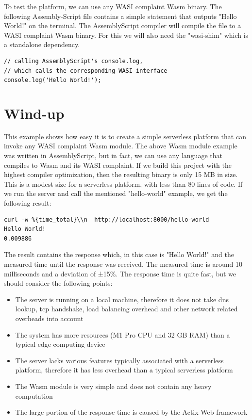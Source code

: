 %
To test the platform, we can use any WASI complaint Wasm binary. The following Assembly-Script file contains a simple statement that outputs "Hello World!" on the terminal. The AssemblyScript compiler will compile the file to a WASI complaint Wasm binary. For this we will also need the "wasi-shim" which is a standalone dependency.
%
\begin{lstlisting}[frame=lines, style=JavaScript, caption={AssemblyScript file with a simple console output}, showstringspaces=false, label={lst:as-hello-world}, captionpos=b]
// calling AssemblyScript's console.log, 
// which calls the corresponding WASI interface
console.log('Hello World!');
\end{lstlisting}

\section{Wind-up}

This example shows how easy it is to create a simple \gls{serverless} platform that can invoke any WASI complaint Wasm module. The above Wasm module example was written in AssemblyScript, but in fact, we can use any language that compiles to Wasm and its WASI complaint. If we build this project with the highest compiler optimization, then the resulting binary is only 15 MB in size. This is a modest size for a serverless platform, with less than 80 lines of code. If we run the server and call the mentioned "hello-world" example, we get the following result:
\begin{lstlisting}[frame=lines]
curl -w %{time_total}\\n  http://localhost:8000/hello-world
Hello World!
0.009886
\end{lstlisting}

The result contains the response which, in this case is "Hello World!" and the measured time until the response was received. The measured time is around 10 milliseconds and a deviation of ±15\%. The response time is quite fast, but we should consider the following points:
\begin{itemize}
    \item The server is running on a local machine, therefore it does not take dns lookup, tcp handshake, load balancing overhead and other network related overheads into account
    \item The system has more resources (M1 Pro CPU and 32 GB RAM) than a typical \gls{edge computing} device
    \item The server lacks various features typically associated with a \gls{serverless} platform, therefore it has less overhead than a typical serverless platform
    \item The Wasm module is very simple and does not contain any heavy computation
    \item The large portion of the response time is caused by the Actix Web framework
\end{itemize}

